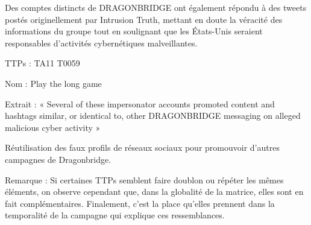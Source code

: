 Des comptes distincts de DRAGONBRIDGE ont également répondu à des tweets postés originellement par Intrusion Truth, mettant en doute la véracité des informations du groupe tout en soulignant que les États-Unis seraient responsables d'activités cybernétiques malveillantes. 

TTPs : TA11 T0059

Nom : Play the long game

Extrait : « Several of these impersonator accounts promoted content and hashtags similar, or identical to, other DRAGONBRIDGE messaging on alleged malicious cyber activity »

Réutilisation des faux profils de réseaux sociaux pour promouvoir d'autres campagnes de Dragonbridge.

Remarque : Si certaines TTPs semblent faire doublon ou répéter les mêmes éléments, on  observe cependant que, dans la globalité de la matrice, elles sont en fait complémentaires. Finalement, c’est la place qu’elles prennent dans la temporalité de la campagne qui explique ces ressemblances.
